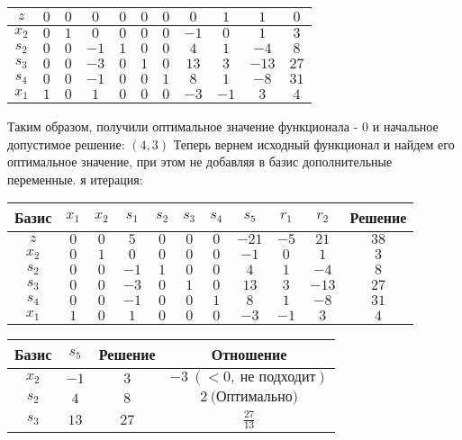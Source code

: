 \documentclass{article}%
\begin{document}
\begin{flushleft}
\begin{tabular}{|c|ccccccccc|c|}
\hline%
$z$&$0$&$0$&$0$&$0$&$0$&$0$&$0$&$1$&$1$&$0$\\%
\hline%
$x_{2}$&$0$&$1$&$0$&$0$&$0$&$0$&$-1$&$0$&$1$&$3$\\%
$s_{2}$&$0$&$0$&$-1$&$1$&$0$&$0$&$4$&$1$&$-4$&$8$\\%
$s_{3}$&$0$&$0$&$-3$&$0$&$1$&$0$&$13$&$3$&$-13$&$27$\\%
$s_{4}$&$0$&$0$&$-1$&$0$&$0$&$1$&$8$&$1$&$-8$&$31$\\%
$x_{1}$&$1$&$0$&$1$&$0$&$0$&$0$&$-3$&$-1$&$3$&$4$\\%
\hline%
\end{tabular}%
\newline%
\newline%
Таким образом, получили оптимальное значение функционала {-} 0 и начальное допустимое решение: %
$(4, 3)$%
\newline%
Теперь вернем исходный функционал и найдем его оптимальное значение, при этом не добавляя в базис дополнительные переменные.%
я итерация: %
\newline%
\newline%
\renewcommand{\arraystretch}{1.3}%
\begin{tabular}{|c|ccccccccc|c|}%
\hline%
Базис&$x_{1}$&$x_{2}$&$s_{1}$&$s_{2}$&$s_{3}$&$s_{4}$&$s_{5}$&$r_{1}$&$r_{2}$&Решение\\%
\hline%
$z$&$0$&$0$&$5$&$0$&$0$&$0$&$-21$&$-5$&$21$&$38$\\%
\hline%
$x_{2}$&$0$&$1$&$0$&$0$&$0$&$0$&$-1$&$0$&$1$&$3$\\%
$s_{2}$&$0$&$0$&$-1$&$1$&$0$&$0$&$4$&$1$&$-4$&$8$\\%
$s_{3}$&$0$&$0$&$-3$&$0$&$1$&$0$&$13$&$3$&$-13$&$27$\\%
$s_{4}$&$0$&$0$&$-1$&$0$&$0$&$1$&$8$&$1$&$-8$&$31$\\%
$x_{1}$&$1$&$0$&$1$&$0$&$0$&$0$&$-3$&$-1$&$3$&$4$\\%
\hline%
\end{tabular}%
\newline%
\newline%
\newline%
\begin{tabular}{|cccc|}%
\hline%
Базис&$s_{5}$&Решение&Отношение\\%
\hline%
$x_{2}$&$-1$&$3$&$-3\: (< 0, \: \text{не подходит})$\\%
$s_{2}$&$4$&$8$&$2\: \text{(Оптимально)}$\\%
$s_{3}$&$13$&$27$&$\frac{27}{13}$\\%

\end{tabular}
\end{flushleft}
\end{document}
